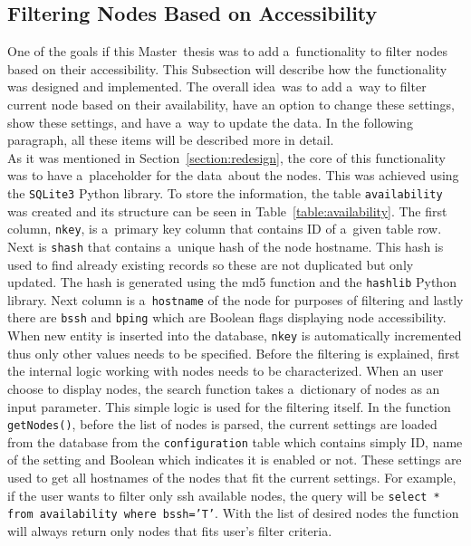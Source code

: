 {{{{\subsection{Filtering Nodes Based on Accessibility}
One of the goals if this Master~thesis was to add a~functionality to filter nodes based on their accessibility. This Subsection will describe how the functionality was designed and implemented. The overall idea~was to add a~way to filter current node based on their availability, have an option to change these settings, show these settings, and have a~way to update the data. In the following paragraph, all these items will be described more in detail.\\
As it was mentioned in Section~\ref{section:redesign}, the core of this functionality was to have a~placeholder for the data~about the nodes. This was achieved using the \texttt{SQLite3} Python library. To store the information, the table \texttt{availability} was created and its structure can be seen in Table~\ref{table:availability}. The first column, \texttt{nkey}, is a~primary key column that contains ID of a~given table row. Next is \texttt{shash} that contains a~unique hash of the node hostname. This hash is used to find already existing records so these are not duplicated but only updated. The hash is generated using the md5 function and the \texttt{hashlib} Python library. Next column is a~\texttt{hostname} of the node for purposes of filtering and lastly there are \texttt{bssh} and \texttt{bping} which are Boolean flags displaying node accessibility. When new entity is inserted into the database, \texttt{nkey} is automatically incremented thus only other values needs to be specified. Before the filtering is explained, first the internal logic working with nodes needs to be characterized. When an user choose to display nodes, the search function takes a~dictionary of nodes as an input parameter. This simple logic is used for the filtering itself. In the function \texttt{getNodes()}, before the list of nodes is parsed, the current settings are loaded from the database from the \texttt{configuration} table which contains simply ID, name of the setting and Boolean which indicates it is enabled or not. These settings are used to get all hostnames of the nodes that fit the current settings. For example, if the user wants to filter only ssh available nodes, the query will be \texttt{select * from availability where bssh='T'}. With the list of desired nodes the function will always return only nodes that fits user's filter criteria.\\

}}}}

